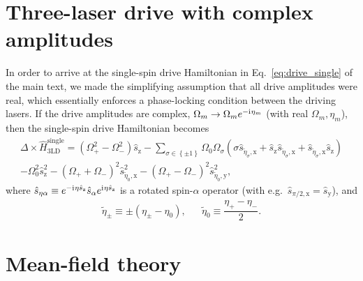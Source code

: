 \documentclass[aps,pra,nofootinbib,twocolumn,superscriptaddress]{revtex4-2}
\renewcommand{\t}{\text} %
\newcommand{\f}[2]{\dfrac{#1}{#2}} %
\newcommand{\p}[1]{\left(#1\right)} %
\renewcommand{\set}[1]{\left\{#1\right\}} %
\renewcommand{\i}{\mathrm{i}\mkern1mu} %
\newcommand{\1}{\mathds{1}}
\newcommand{\s}{\hat s}
\renewcommand{\H}{\hat H}
\newcommand{\x}{\text{x}}
\newcommand{\y}{\text{y}}
\newcommand{\z}{\text{z}}
\begin{document}
\section{Three-laser drive with complex amplitudes}
\label{sec:full_drive}

In order to arrive at the single-spin drive Hamiltonian in Eq.~\eqref{eq:drive_single} of the main text, we made the simplifying assumption that all drive amplitudes were real, which essentially enforces a phase-locking condition between the driving lasers.
If the drive amplitudes are complex, $\Omega_m\to\Omega_me^{-\i\eta_m}$ (with real $\Omega_m,\eta_m$), then the single-spin drive Hamiltonian becomes
\begin{multline}
  \Delta \times \H_{\t{3LD}}^{\t{single}}
  = \p{\Omega_+^2 - \Omega_-^2} \s_\z
  - \sum_{\sigma\in\set{\pm1}} \Omega_0 \Omega_\sigma
  \p{\sigma \s_{\tilde\eta_\sigma,\x}
    + \s_\z \s_{\tilde\eta_\sigma,\x}
    + \s_{\tilde\eta_\sigma,\x} \s_\z} \\
  - \Omega_0^2 \s_\z^2 - \p{\Omega_+ + \Omega_-}^2 \s_{\tilde\eta_0,\x}^2
  - \p{\Omega_+ - \Omega_-}^2 \s_{\tilde\eta_0,\y}^2,
\end{multline}
where $\s_{\eta\alpha} \equiv e^{-\i\eta \s_\z} \s_\alpha e^{\i\eta \s_\z}$ is a rotated spin-$\alpha$ operator (with e.g.~$\s_{\pi/2,\x}=\s_\y$), and
\begin{align}
  \tilde\eta_\pm \equiv \pm \p{\eta_\pm - \eta_0},
  &&
  \tilde\eta_0 \equiv \f{\eta_+ - \eta_-}{2}.
\end{align}

\section{Mean-field theory}
\label{sec:MFT}
\end{document}
